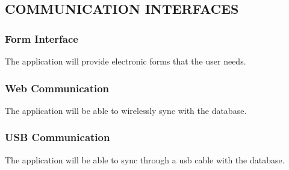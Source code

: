 \documentclass[twoside,letterpaper]{article}
\begin{document}
\subsection[COMMUNICATION INTERFACES]{\rmfamily\bfseries\color{black}
COMMUNICATION INTERFACES}
{\rmfamily\color{black}

\subsubsection{Form Interface}
The application will provide electronic forms that the user needs.

\subsubsection{Web Communication}
The application will be able to wirelessly sync with the database.

\subsubsection{USB Communication}
The application will be able to sync through a usb cable with the database.}

\newpage

\bigskip
\end{document}
